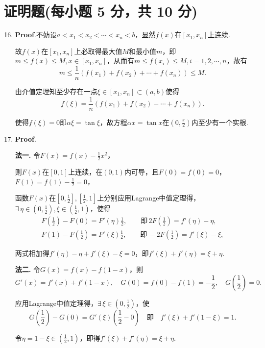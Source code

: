 \documentclass[../Main.tex]{subfiles}
\begin{document}
\section{证明题(每小题 5 分，共 10 分)}
\begin{enumerate}
    \setcounter{enumi}{15}
    \item \textbf{Proof}.不妨设$a<x_{1}<x_{2}<\cdots<x_{n}<b$，显然$f(x)$在$[
                  x_{1},x_{n}]$上连续.

          故$f(x)$在$[x_{1},x_{n}]$上必取得最大值$M$和最小值$m$，即$m\leq f(x)\leq M,
              x\in[x_{1},x_{n}]$，从而有$m\leq f(x_{i})\leq M,i=1,2,\cdots,n$，故有
          \[
              m\leq\frac{1}{n}\left(f(x_{1})+f(x_{2})+\cdots+f(x_{n})\right)\leq M.
          \]

          由介值定理知至少存在一点$\xi\in[x_{1},x_{n}]\subset(a,b)$使得
          \[
              f(\xi)=\frac{1}{n}\left(f(x_{1})+f(x_{2})+\cdots+f(x_{n})\right).
          \]

          使得$f(\xi)=0$即$\alpha\xi=\tan\xi$，故方程$\alpha x=\tan x$在$\left(0,\frac{\pi}{2}
              \right)$内至少有一个实根.

    \item \textbf{Proof}.

          \textbf{法一.} 令$F(x)=f(x)-\frac{1}{2}x^{2}$，

          则$F(x)$在$[0,1]$上连续，在$(0,1)$内可导，且$F(0)=f(0)=0$，$F(1)=f(1)-\frac{1}{2}
              =0$，

          函数$F(x)$在$\left[0,\frac{1}{2}\right],\left[\frac{1}{2},1\right]$上分别应用Lagrange中值定理得，$\exists
              \,\eta\in\left(0,\frac{1}{2}\right),\xi\in\left(\frac{1}{2},1\right)$，使得
          \[
              \begin{gathered}
                  F\left(\frac{1}{2}\right)-F(0)=F'(\eta)\frac{1}{2},\qquad\text{即}\,2F\left(\frac{1}{2}\right)=f'(\eta)-\eta,\\
                  F(1)-F\left(\frac{1}{2}\right)=F'(\xi)\frac{1}{2},\qquad\text{即}\,-2F\left(\frac{1}{2}\right)=f'(\xi)-\xi,
              \end{gathered}
          \]

          两式相加得$f'(\eta)-\eta+f'(\xi)-\xi=0$，即$f'(\xi)+f'(\eta)=\xi+\eta$.

          \textbf{法二.} 令$G(x)=f(x)-f(1-x)$，则
          \[
              G'(x)=f'(x)+f'(1-x),\quad G(0)=f(0)-f(1)=-\frac{1}{2},\quad G\left(\frac{1}{2}
              \right)=0.
          \]

          应用Lagrange中值定理得，$\exists\,\xi\in\left(0,\frac{1}{2}\right)$，使
          \[
              G\left(\frac{1}{2}\right)-G(0)=G'(\xi)\left(\frac{1}{2}-0\right)\quad\text{即}
              \quad f'(\xi)+f'(1-\xi)=1.
          \]

          令$\eta=1-\xi\in\left(\frac{1}{2},1\right)$，即得$f'(\xi)+f'(\eta)=\xi+\eta$.
\end{enumerate}
\end{document}

